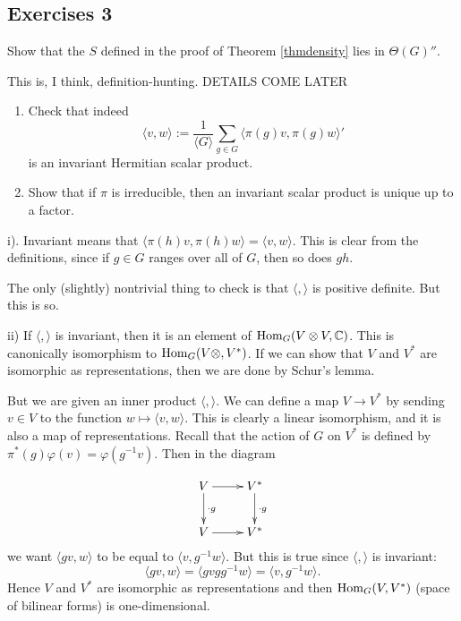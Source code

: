 \documentclass[11pt, english]{article}
\begin{document}
\subsection{Exercises 3}

\begin{exc}
Show that the $S$ defined in the proof of Theorem \eqref{thmdensity} lies in $\Theta(G)''$.
\end{exc}
\begin{sol}
 This is, I think, definition-hunting. DETAILS COME LATER
\end{sol}

\begin{exc}
  \begin{enumerate}
  \item Check that indeed 
$$
\langle v, w \rangle := \frac{1}{\langle G \rangle} \sum_{g \in G} \langle \pi(g) v, \pi(g) w \rangle'
$$
is an invariant Hermitian scalar product.
\item Show that if $\pi$ is irreducible, then an invariant scalar product is unique up to a factor.
  \end{enumerate}
\end{exc}

\begin{sol}
i). Invariant means that $\langle \pi(h) v, \pi(h) w \rangle = \langle v, w \rangle $. This is clear from the definitions, since if $g \in G$ ranges over all of $G$, then so does $gh$.

The only (slightly) nontrivial thing to check is that $\langle,\rangle$ is positive definite. But this is so.


ii) If $\langle,\rangle$ is invariant, then it is an element of $\operatorname{Hom}_G(V \otimes V, \mathbb{C})$. This is canonically isomorphism to $\operatorname{Hom}_G(V \otimes, V^\ast)$. If we can show that $V$ and $V^\ast$ are isomorphic as representations, then we are done by Schur's lemma. 

But we are given an inner product $\langle , \rangle$. We can define a map $V \to V^\ast$ by sending $v \in V$ to the function $w \mapsto \langle v, w \rangle$. This is clearly a linear isomorphism, and it is also a map of representations. Recall that the action of $G$ on $V^\ast$ is defined by $\pi^\ast(g) \varphi (v) = \varphi(g^{-1} v)$. Then in the diagram

$$
\xymatrix{
V \ar[r] \ar[d]^{\cdot g} & V^\ast \ar[d]^{\cdot g} \\
V \ar[r]  & V^\ast 
}
$$
we want $\langle gv, w \rangle$ to be equal to $\langle v, g^{-1} w \rangle$. But this is true since $\langle ,\rangle$ is invariant:
$$
\langle gv, w \rangle = \langle gv g g^{-1} w \rangle = \langle v, g^{-1}w \rangle.
$$
Hence $V$ and $V^\ast$ are isomorphic as representations and then $\operatorname{Hom}_G(V,V^\ast)$ (space of bilinear forms) is one-dimensional. 
\end{sol}
\end{document}
